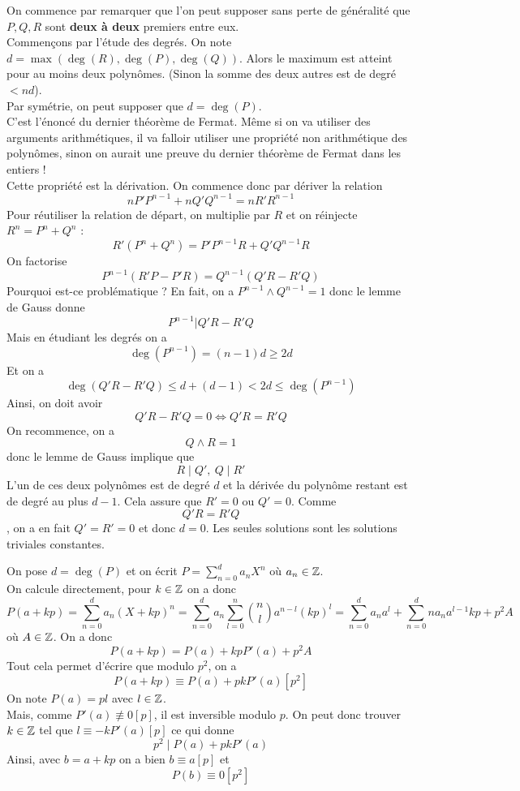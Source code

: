 \begin{sol}
On commence par remarquer que l'on peut supposer sans perte de généralité que $P,Q,R$ sont \textbf{deux à deux} premiers entre eux. \\
Commençons par l'étude des degrés. On note $d=\max (\deg(R),\deg(P),\deg(Q))$. Alors le maximum est atteint pour au moins deux polynômes. (Sinon la somme des deux autres est de degré $<nd$). \\
Par symétrie, on peut supposer que $d=\deg(P)$. \\
C'est l'énoncé du dernier théorème de Fermat. Même si on va utiliser des arguments arithmétiques, il va falloir utiliser une propriété non arithmétique des polynômes, sinon on aurait une preuve du dernier théorème de Fermat dans les entiers ! \\

Cette propriété est la dérivation. On commence donc par dériver la relation
$$nP'P^{n-1}+nQ'Q^{n-1}=nR'R^{n-1} $$
Pour réutiliser la relation de départ, on multiplie par $R$ et on réinjecte $R^n = P^n+Q^n$ :
$$R'(P^n+Q^n)=P'P^{n-1}R+Q'Q^{n-1}R $$
On factorise
$$P^{n-1}(R'P-P'R)=Q^{n-1}(Q'R-R'Q) $$
Pourquoi est-ce problématique ? En fait, on a $P^{n-1}\wedge Q^{n-1}=1$ donc le lemme de Gauss donne
$$P^{n-1}|Q'R-R'Q $$
Mais en étudiant les degrés on a
$$\deg(P^{n-1})=(n-1)d\geq 2d $$
Et on a
$$ \deg(Q'R-R'Q)\leq d+(d-1)<2d\leq \deg(P^{n-1})$$
Ainsi, on doit avoir
$$Q'R-R'Q=0\iff Q'R=R'Q $$
On recommence, on a
$$Q\wedge R=1 $$ donc le lemme de Gauss implique que
$$R\mid Q', \: Q\mid R' $$
L'un de ces deux polynômes est de degré $d$ et la dérivée du polynôme restant est de degré au plus $d-1$. Cela assure que $R'=0$ ou $Q'=0$. Comme
$$Q'R=R'Q $$, on a en fait $Q'=R'=0$ et donc $d=0$. Les seules solutions sont les solutions triviales constantes.
\end{sol}


\begin{sol}
On pose $d=\deg(P)$ et on écrit $P=\sum_{n=0}^da_nX^n$ où $a_n\in \mathbb Z$. \\
On calcule directement, pour $k\in \mathbb Z$ on a donc
$$P(a+kp)=\sum_{n=0}^da_n(X+kp)^n=\sum_{n=0}^da_n\sum_{l=0}^n\binom{n}{l}a^{n-l}(kp)^l =\sum_{n=0}^da_na^l+\sum_{n=0}^dna_na^{l-1}kp+p^2A$$
où $A\in \mathbb Z$. On a donc
$$P(a+kp)=P(a)+kpP'(a)+p^2A $$
Tout cela permet d'écrire que modulo $p^2$, on a
$$P(a+kp)\equiv P(a)+pkP'(a)[p^2] $$
On note $P(a)=pl$ avec $l\in \mathbb Z$. \\
Mais, comme $P'(a)\not\equiv 0[p]$, il est inversible modulo $p$. On peut donc trouver $k\in \mathbb Z$ tel que $l\equiv -kP'(a)[p]$ ce qui donne
$$p^2\mid P(a)+pkP'(a) $$
Ainsi, avec $b=a+kp$ on a bien $b\equiv a[p]$ et
$$P(b)\equiv 0[p^2] $$
\end{sol}


